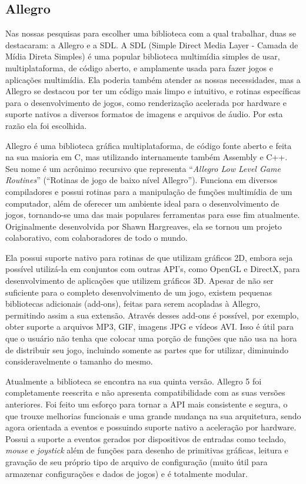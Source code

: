 \subsection{Allegro}
\label{allegro}
%
Nas nossas pesquisas para escolher uma biblioteca com a qual trabalhar, duas se destacaram: a Allegro e a SDL. A SDL (Simple Direct Media Layer - 
Camada de Mídia Direta Simples) é uma popular biblioteca multimídia simples de usar, multiplataforma, de código aberto, e amplamente usada para fazer  jogos e aplicações multimídia. Ela poderia também atender as nossas necessidades, mas a Allegro se destacou por ter um código mais limpo e intuitivo, e rotinas específicas para o desenvolvimento de jogos, como renderização acelerada por hardware e suporte nativos a diversos formatos de imagens e arquivos de áudio. Por esta razão ela foi escolhida.
\par 
Allegro \cite{AllegroDoc} é uma biblioteca gráfica multiplataforma, de código fonte aberto e feita na sua maioria em C, mas utilizando internamente também Assembly e C++. Seu nome é um acrônimo recursivo que representa ``\textit{Allegro Low Level Game Routines}'' (``Rotinas de jogo de baixo nível Allegro''). Funciona em diversos compiladores e possui rotinas para a manipulação de funções multimídia de um computador, além de oferecer um ambiente ideal para o desenvolvimento de jogos, tornando-se uma das mais populares ferramentas para esse fim atualmente. Originalmente desenvolvida por Shawn Hargreaves, ela se tornou um projeto colaborativo, com colaboradores de todo o mundo.
\par
Ela possui suporte nativo para rotinas de que utilizam gráficos 2D, embora seja possível utilizá-la em conjuntos com outras API's, como OpenGL e DirectX, para desenvolvimento de aplicações que utilizem gráficos 3D. Apesar de não ser suficiente para o completo desenvolvimento 
de um jogo, existem pequenas bibliotecas adicionais (add-ons), feitas para serem acopladas à Allegro, permitindo assim a sua extensão. Através 
desses add-ons é possível, por exemplo, obter suporte a arquivos MP3, GIF, imagens JPG e vídeos AVI. Isso é útil para que o usuário não tenha que colocar uma porção de funções que não usa na hora de distribuir seu jogo, incluindo somente as partes que for utilizar, diminuindo consideravelmente o tamanho do mesmo.
\par
Atualmente a biblioteca se encontra na sua quinta versão. Allegro 5 foi completamente reescrita e não apresenta compatibilidade com as suas versões anteriores. Foi feito um esforço para tornar a API mais consistente e segura, o que trouxe melhorias funcionais e uma grande mudança na sua arquitetura, sendo agora orientada a eventos e possuindo suporte nativo a aceleração por hardware. Possui a suporte a eventos gerados por dispositivos de entradas como teclado, \textit{mouse} e \textit{joystick} além de funções para desenho de primitivas gráficas, leitura e gravação de seu próprio tipo de arquivo de configuração (muito útil para armazenar configurações e dados de jogos) e é totalmente modular.
